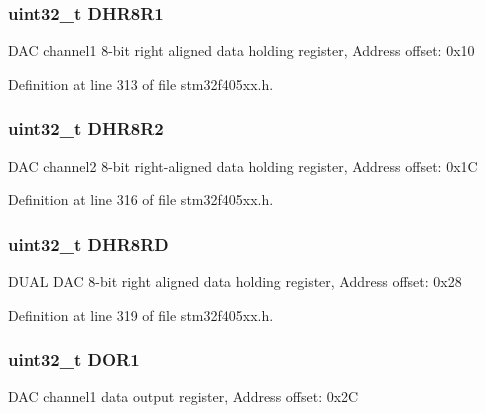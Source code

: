 \subsubsection[{\texorpdfstring{D\+H\+R8\+R1}{DHR8R1}}]{ uint32\+\_\+t D\+H\+R8\+R1}\hypertarget{struct_d_a_c___type_def_ad0a200e12acad17a5c7d2059159ea7e1}{}\label{struct_d_a_c___type_def_ad0a200e12acad17a5c7d2059159ea7e1}
D\+AC channel1 8-\/bit right aligned data holding register, Address offset\+: 0x10 

Definition at line 313 of file stm32f405xx.\+h.

\subsubsection[{\texorpdfstring{D\+H\+R8\+R2}{DHR8R2}}]{ uint32\+\_\+t D\+H\+R8\+R2}\hypertarget{struct_d_a_c___type_def_a4c435f0e34ace4421241cd5c3ae87fc2}{}\label{struct_d_a_c___type_def_a4c435f0e34ace4421241cd5c3ae87fc2}
D\+AC channel2 8-\/bit right-\/aligned data holding register, Address offset\+: 0x1C 

Definition at line 316 of file stm32f405xx.\+h.

\subsubsection[{\texorpdfstring{D\+H\+R8\+RD}{DHR8RD}}]{ uint32\+\_\+t D\+H\+R8\+RD}\hypertarget{struct_d_a_c___type_def_a9590269cba8412f1be96b0ddb846ef44}{}\label{struct_d_a_c___type_def_a9590269cba8412f1be96b0ddb846ef44}
D\+U\+AL D\+AC 8-\/bit right aligned data holding register, Address offset\+: 0x28 

Definition at line 319 of file stm32f405xx.\+h.

\subsubsection[{\texorpdfstring{D\+O\+R1}{DOR1}}]{ uint32\+\_\+t D\+O\+R1}\hypertarget{struct_d_a_c___type_def_aa710505be03a41981c35bacc7ce20746}{}\label{struct_d_a_c___type_def_aa710505be03a41981c35bacc7ce20746}
D\+AC channel1 data output register, Address offset\+: 0x2C 

